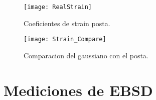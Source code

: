 \begin{figure}[!htb]
  \centering
  \texttt{[image: RealStrain]}
  \caption{Coeficientes de strain posta.}
  \label{fig:RealStrain}
\end{figure}

\begin{figure}[!htb]
  \centering
  \texttt{[image: Strain\_Compare]}
  \caption{Comparacion del gaussiano con el posta.}
  \label{fig:RealvsGauss}
\end{figure}

\newpage
\fi
\section{Mediciones de EBSD}\label{S:MatEBSD}


